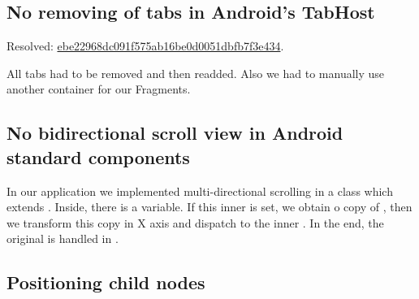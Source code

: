 \subsection{No removing of tabs in Android's TabHost}
\label{subsec:problem-tabhost}


Resolved: \href{https://github.com/michalrus/agh-mindmap/commit/ebe22968dc091f575ab16be0d0051dbfb7f3e434}{ebe22968dc091f575ab16be0d0051dbfb7f3e434}.

All tabs had to be removed and then readded. Also we had to manually use another container for our Fragments.

\subsection{No bidirectional scroll view in Android standard components}
\label{subsec:problem-scrollview}
In our application we implemented multi-directional scrolling in a class  which extends . Inside, there is a  variable. If this inner  is set, we obtain o copy of , then we transform this copy in X axis and dispatch to the inner . In the end, the original  is handled in .

\subsection{Positioning child nodes}
\label{subsec:problem-positioning}
